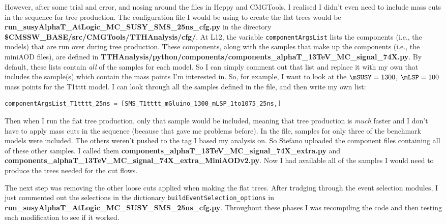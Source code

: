 However, after some trial and error, and nosing around the files in Heppy and CMGTools, I realised I didn't even need to include mass cuts in the sequence for tree production. The configuration file I would be using to create the flat trees would be \textbf{run\_\-susyAlphaT\_\-AtLogic\_\-MC\_\-SUSY\_\-SMS\_\-25ns\_\-cfg.py} in the directory \textbf{\$CMSSW\_\-BASE/src/CMGTools/TTHAnalysis/cfg/}. At L12, the variable \texttt{componentArgsList} lists the components (i.e., the models) that are run over during tree production. These components, along with the samples that make up the components (i.e., the miniAOD files), are defined in \textbf{TTHAnalysis/python/components/components\_\-alphaT\_\-13TeV\_\-MC\_\-signal\_\-74X.py}. By default, these lists contain \emph{all} of the samples for each model. So I can simply comment out that list and replace it with my own that includes the sample(s) which contain the mass points I'm interested in. So, for example, I want to look at the $\mSUSY = 1300$, $\mLSP = 100$ mass points for the T1tttt model. I can look through all the samples defined in the file, and then write my own list:

\begin{lstlisting}[belowskip=-0.7cm, language=python, numbers=none]
componentArgsList_T1tttt_25ns = [SMS_T1tttt_mGluino_1300_mLSP_1to1075_25ns,]
\end{lstlisting}

Then when I run the flat tree production, only that sample would be included, meaning that tree production is \emph{much} faster and I don't have to apply mass cuts in the sequence (because that gave me problems before). In the file, samples for only three of the benchmark models were included. The others weren't pushed to the tag I based my analysis on. So Stefano uploaded the component files containing all of these other samples. I called them \textbf{components\_\-alphaT\_\-13TeV\_\-MC\_\-signal\_\-74X\_\-extra.py} and \textbf{components\_\-alphaT\_\-13TeV\_\-MC\_\-signal\_\-74X\_\-extra\_\-MiniAODv2.py}. Now I had available all of the samples I would need to produce the trees needed for the cut flows.

The next step was removing the other loose cuts applied when making the flat trees. After trudging through the event selection modules, I just commented out the selections in the dictionary \texttt{buildEventSelection\_options} in \textbf{run\_\-susyAlphaT\_\-AtLogic\_\-MC\_\-SUSY\_\-SMS\_\-25ns\_\-cfg.py}. Throughout these phases I was recompiling the code and then testing each modification to see if it worked.

